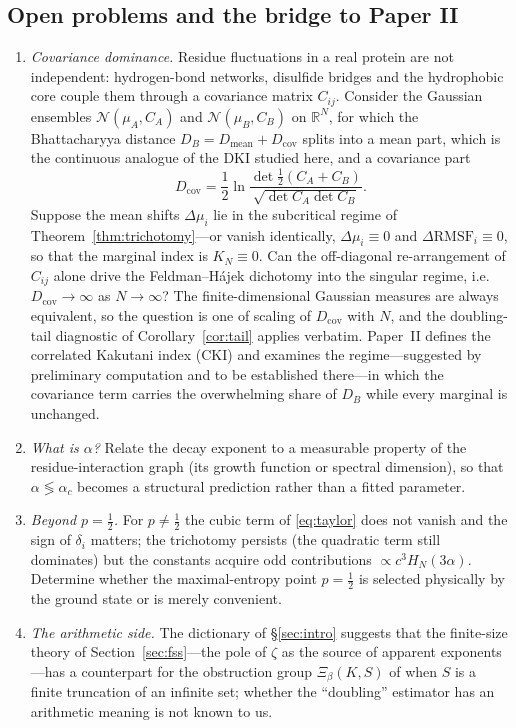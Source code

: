 \documentclass[11pt,reqno]{amsart}
\theoremstyle{plain}
\theoremstyle{definition}
\theoremstyle{remark}
\numberwithin{equation}{section}
\newcommand{\Rr}{\mathbb{R}}
\begin{document}
\subsection*{Open problems and the bridge to Paper II}
\begin{enumerate}[label=(\arabic*),leftmargin=*]
\item \emph{Covariance dominance.} Residue fluctuations in a real protein are not independent: hydrogen-bond networks, disulfide bridges and the hydrophobic core couple them through a covariance matrix $C_{ij}$. Consider the Gaussian ensembles $\mathcal N(\mu_A,C_A)$ and $\mathcal N(\mu_B,C_B)$ on $\Rr^N$, for which the Bhattacharyya distance $D_B=D_{\mathrm{mean}}+D_{\mathrm{cov}}$ splits into a mean part, which is the continuous analogue of the DKI studied here, and a covariance part
\[
D_{\mathrm{cov}}=\frac12\ln\frac{\det\frac12(C_A+C_B)}{\sqrt{\det C_A\det C_B}} .
\]
Suppose the mean shifts $\Delta\mu_i$ lie in the subcritical regime of Theorem~\ref{thm:trichotomy}---or vanish identically, $\Delta\mu_i\equiv0$ and $\Delta\mathrm{RMSF}_i\equiv0$, so that the marginal index is $K_N\equiv0$. Can the off-diagonal re-arrangement of $C_{ij}$ alone drive the Feldman--H\'ajek dichotomy into the singular regime, i.e.\ $D_{\mathrm{cov}}\to\infty$ as $N\to\infty$? The finite-dimensional Gaussian measures are always equivalent, so the question is one of scaling of $D_{\mathrm{cov}}$ with $N$, and the doubling-tail diagnostic of Corollary~\ref{cor:tail} applies verbatim. Paper~II defines the correlated Kakutani index (CKI) and examines the regime---suggested by preliminary computation and to be established there---in which the covariance term carries the overwhelming share of $D_B$ while every marginal is unchanged.
\item \emph{What is $\alpha$?} Relate the decay exponent to a measurable property of the residue-interaction graph (its growth function or spectral dimension), so that $\alpha\lessgtr\alpha_c$ becomes a structural prediction rather than a fitted parameter.
\item \emph{Beyond $p=\frac12$.} For $p\ne\frac12$ the cubic term of \eqref{eq:taylor} does not vanish and the sign of $\delta_i$ matters; the trichotomy persists (the quadratic term still dominates) but the constants acquire odd contributions $\propto c^3H_N(3\alpha)$. Determine whether the maximal-entropy point $p=\frac12$ is selected physically by the ground state or is merely convenient.
\item \emph{The arithmetic side.} The dictionary of \S\ref{sec:intro} suggests that the finite-size theory of Section~\ref{sec:fss}---the pole of $\zeta$ as the source of apparent exponents---has a counterpart for the obstruction group $\Xi_\beta(K,S)$ of \cite{Chen2026} when $S$ is a finite truncation of an infinite set; whether the ``doubling'' estimator has an arithmetic meaning is not known to us.
\end{enumerate}
\end{document}
